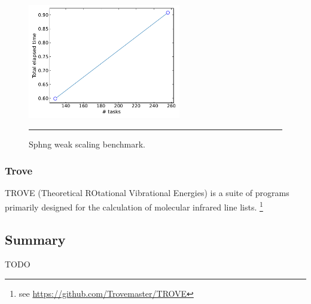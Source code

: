 \documentclass[10pt]{article}
\begin{document}
\begin{figure}[h!]
	\centering
	\includegraphics[height=5cm]{Sphng_weak.pdf}
	\vspace{0.1cm}
	\hrule
	\vspace{0.01cm}
	\caption{Sphng weak scaling benchmark.}
	\label{fig::sphng_ws}
\end{figure}


\clearpage
\subsubsection{Trove}
TROVE (Theoretical ROtational Vibrational Energies) is a suite of programs
primarily designed for the calculation of molecular infrared line lists.
\footnote{see \url{https://github.com/Trovemaster/TROVE}}


\clearpage
\subsection{Summary}

{\color{red} TODO}
\end{document}
